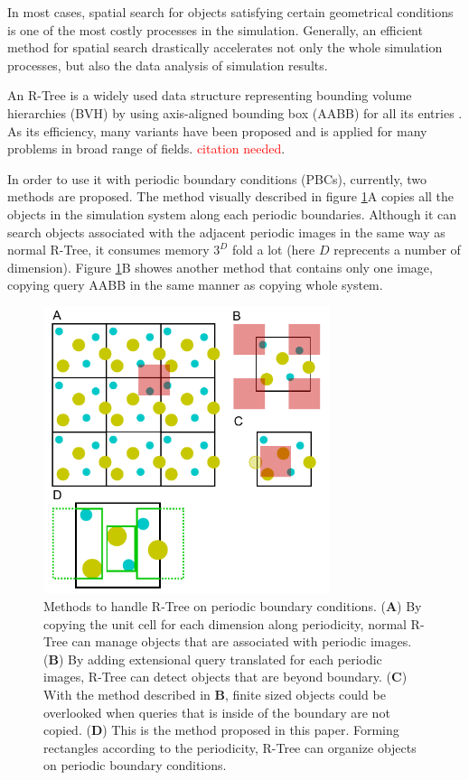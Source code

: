 \documentclass[10pt,letterpaper,twocolumn]{article}
\begin{document}
In most cases, spatial search for objects satisfying certain geometrical
conditions is one of the most costly processes in the simulation. Generally, an
efficient method for spatial search drastically accelerates not only the whole
simulation processes, but also the data analysis of simulation results.

An R-Tree is a widely used data structure representing bounding volume
hierarchies (BVH) by using axis-aligned bounding box (AABB) for all its entries
\cite{Guttman1984}. As its efficiency, many variants have been proposed and is
applied for many problems in broad range of fields.
\textcolor{red}{citation needed}.

In order to use it with periodic boundary conditions (PBCs), currently,
two methods are proposed\cite{CoSTR-R-tree2016}. The method visually described in
figure \ref{fig1}A copies all the objects in the simulation system
along each periodic boundaries. Although it can search objects associated with
the adjacent periodic images in the same way as normal R-Tree, it consumes
memory $3^D$ fold a lot (here $D$ reprecents a number of dimension). Figure
\ref{fig1}B showes another method that contains only one image,
copying query AABB in the same manner as copying whole system.

\begin{figure}[hbt]
    \includegraphics[width=8.4cm, bb=6 3 220 224]{fig1.eps}
    \caption{Methods to handle R-Tree on periodic boundary conditions.
    (\textbf{A})
    By copying the unit cell for each dimension along periodicity, normal R-Tree
    can manage objects that are associated with periodic images.
    (\textbf{B})
    By adding extensional query translated for each periodic images, R-Tree can
    detect objects that are beyond boundary.
    (\textbf{C})
    With the method described in \textbf{B}, finite sized objects could be
    overlooked when queries that is inside of the boundary are not copied.
    (\textbf{D})
    This is the method proposed in this paper. Forming rectangles according to
    the periodicity, R-Tree can organize objects on periodic boundary
    conditions.}
    \label{fig1}
\end{figure}
\end{document}
